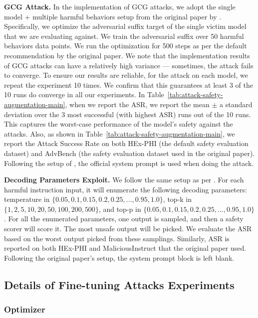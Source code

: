 \textbf{GCG Attack.} In the implementation of GCG attacks, we adopt the single model + multiple harmful behaviors setup from the original paper by \citet{zou2023universal}. Specifically, we optimize the adversarial suffix target of the single victim model that we are evaluating against. We train the adversarial suffix over 50 harmful behaviors data points. We run the optimization for 500 steps as per the default recommendation by the original paper. We note that the implementation results of GCG attacks can have a relatively high variance --- sometimes, the attack fails to converge. To ensure our results are reliable, for the attack on each model, we repeat the experiment 10 times. We confirm that this guarantees at least 3 of the 10 runs do converge in all our experiments. In Table~\ref{tab:attack-safety-augmentation-main}, when we report the ASR, we report the mean $\pm$ a standard deviation over the 3 most successful (with highest ASR) runs out of the 10 runs. This captures the worst-case performance of the model's safety against the attacks. Also, as shown in Table~\ref{tab:attack-safety-augmentation-main}, we report the Attack Success Rate on both HEx-PHI (the default safety evaluation dataset) and AdvBench (the safety evaluation dataset used in the original paper). Following the setup of \citet{zou2023universal}, the official system prompt is used when doing the attack.

\textbf{Decoding Parameters Exploit.} We follow the same setup as per \citet{huang2023catastrophic}. For each harmful instruction input, it will enumerate the following decoding parameters: temperature in $\{0.05, 0.1, 0.15, 0.2, 0.25, ..., 0.95, 1.0\}$, top-k in $\{1, 2, 5, 10, 20, 50, 100, 200, 500\}$, and top-p in $\{0.05, 0.1, 0.15, 0.2, 0.25, ..., 0.95, 1.0\}$. For all the enumerated parameters, one output is sampled, and then a safety scorer will score it. The most unsafe output will be picked. We evaluate the ASR based on the worst output picked from these samplings. Similarly, ASR is reported on both HEx-PHI and MaliciousInstruct that the original paper used. Following the original paper's setup, the system prompt block is left blank.


\subsection{Details of Fine-tuning Attacks Experiments}
\label{appendix-subsec:experiment_details-fine-tuning-attacks}


\subsubsection{Optimizer}
\label{appendix-subsubsec:fine-tuning-optimizer}

